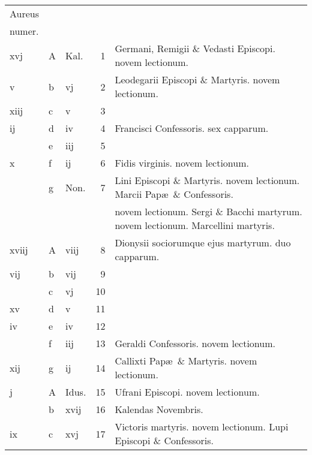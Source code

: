 \documentclass[letter,11pt]{book}
\begin{document}
\begin{center}
\begin{tabular}{l | l | l | r | l}
\color{Red}Aureus & & & \\
\color{Red}numer. & & & \\
\color{Red} xvj & \color{Red} A & \color{Red} Kal. & 1 & Germani, Remigii \& Vedasti Episcopi. \color{Red} novem lectionum. \\
\color{Red} v & b & \color{Red} vj & 2 & Leodegarii Episcopi \& Martyris. \color{Red} novem lectionum. \\
\color{Red} xiij & c & \color{Red} v & 3 & \\
\color{Red} ij & d & \color{Red} iv & 4 & \color{Red} Francisci Confessoris. \color{Red} sex capparum. \\
\color{Red}  & e & \color{Red} iij & 5 & \\
\color{Red} x & f & \color{Red} ij & 6 & Fidis virginis. \color{Red} novem lectionum. \\
\color{Red}  & g & Non. & 7 & Lini Episcopi \& Martyris. \color{Red} novem lectionum. \color{black} Marcii Pap\ae \ \& Confessoris. \\
 &  &  &  & \quad \color{Red} novem lectionum. \color{black} Sergi \& Bacchi martyrum. \color{Red} novem lectionum. \color{black} Marcellini martyris. \\
\color{Red} xviij & \color{Red} A & \color{Red} viij & 8 & Dionysii sociorumque ejus martyrum. \color{Red} duo capparum. \\
\color{Red} vij & b & \color{Red} vij & 9 & \\
\color{Red}  & c & \color{Red} vj & 10 & \\
\color{Red} xv & d & \color{Red} v & 11 & \\
\color{Red} iv & e & \color{Red} iv & 12 & \\
\color{Red}  & f & \color{Red} iij & 13 & Geraldi Confessoris. \color{Red} novem lectionum. \\
\color{Red} xij & g & \color{Red} ij & 14 & Callixti Pap\ae \ \& Martyris. \color{Red} novem lectionum. \\
\color{Red} j & \color{Red} A & Idus. & 15 & Ufrani Episcopi. \color{Red} novem lectionum. \\%
\color{Red}  & b & \color{Red} xvij & 16 & \qquad \color{Red} Kalendas Novembris. \\
\color{Red} ix & c & \color{Red} xvj & 17 & Victoris martyris. \color{Red} novem lectionum. \color{black} Lupi Episcopi \& Confessoris. \\

\end{tabular}
\end{center}
\end{document}
